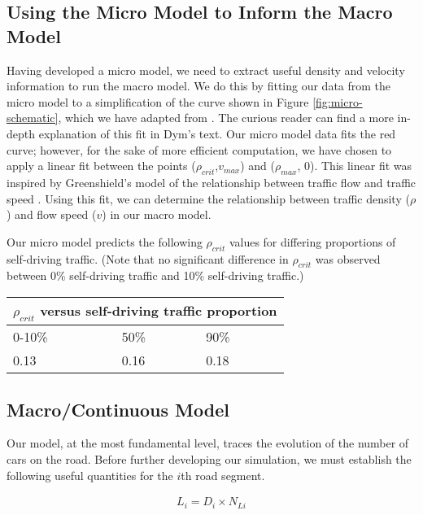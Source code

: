 \subsection{Using the Micro Model to Inform the Macro Model}
Having developed a micro model, we need to extract useful density and velocity information to run the macro model.  We do this by fitting our data from the micro model to a simplification of the curve shown in Figure \ref{fig:micro-schematic}, which we have adapted from \cite{Dym2004PrinciplesModeling}.  The curious reader can find a more in-depth explanation of this fit in Dym's text.  Our micro model data fits the red curve; however, for the sake of more efficient computation, we have chosen to apply a linear fit between the points ($\rho_{crit}$,$v_{max}$) and ($\rho_{max}$, 0). This linear fit was inspired by Greenshield's model of the relationship between traffic flow and traffic speed \cite{KachrooTrafficFramework}. Using this fit, we can determine the relationship between traffic density ($\rho$) and flow speed ($v$) in our macro model.



Our micro model predicts the following $\rho_{crit}$ values for differing proportions of self-driving traffic. (Note that no significant difference in $\rho_{crit}$ was observed between 0\% self-driving traffic and 10\% self-driving traffic.)

\bigskip

\begin{tabular}{
|p{2cm}|p{2cm}|p{2cm}| }
 \hline
 \multicolumn{3}{|c|}{$\rho_{crit}$ versus self-driving traffic proportion} \\
 \hline
 0-10\% & 50\% & 90\% \\
 \hline
  0.13 & 0.16 & 0.18 \\
 \hline
\end{tabular}

\subsection{Macro/Continuous Model}

Our model, at the most fundamental level, traces the evolution of the number of cars on the road.  Before further developing our simulation, we must establish the following useful quantities for the $i$th road segment. 

\begin{align}
L_i = D_i \times N_{Li}
\end{align}

